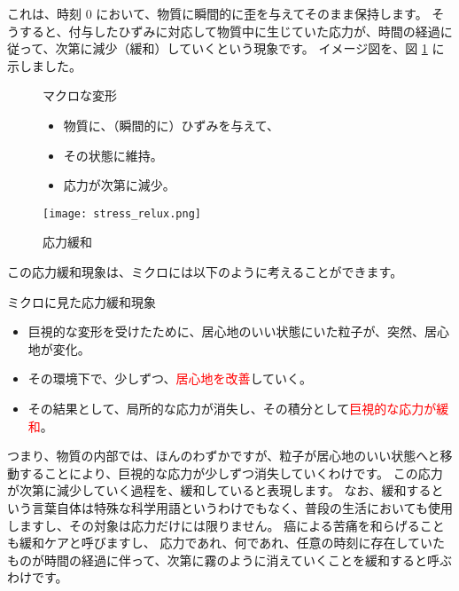 \documentclass[uplatex,dvipdfmx,a4paper,11pt]{jsarticle}
\begin{document}
これは、時刻 0 において、物質に瞬間的に歪を与えてそのまま保持します。
そうすると、付与したひずみに対応して物質中に生じていた応力が、時間の経過に従って、次第に減少（緩和）していくという現象です。
イメージ図を、図 \ref{fig:stress_relux} に示しました。
\begin{figure}[htb]
	\begin{center}
		\begin{minipage}{0.45\textwidth}
			\begin{itembox}[l]{マクロな変形}
				\begin{itemize}
					\item 物質に、（瞬間的に）ひずみを与えて、
					\item その状態に維持。
					\item 応力が次第に減少。
				\end{itemize}
			\end{itembox}
		\end{minipage}
		\begin{minipage}{0.45\textwidth}
			\begin{center}
			\texttt{[image: stress\_relux.png]}
			\end{center}
		\end{minipage}
		\caption{応力緩和}
		\label{fig:stress_relux}
	\end{center}
\end{figure}

この応力緩和現象は、ミクロには以下のように考えることができます。
\begin{center}
	\begin{minipage}{0.9\textwidth}
		\begin{itembox}[l]{ミクロに見た応力緩和現象}
			\begin{itemize}
				\item 巨視的な変形を受けたために、居心地のいい状態にいた粒子が、突然、居心地が変化。
				\item その環境下で、少しずつ、\textcolor{red}{居心地を改善}していく。
				\item その結果として、局所的な応力が消失し、その積分として\textcolor{red}{巨視的な応力が緩和}。
			\end{itemize}
		\end{itembox}
	\end{minipage}
\end{center}
つまり、物質の内部では、ほんのわずかですが、粒子が居心地のいい状態へと移動することにより、巨視的な応力が少しずつ消失していくわけです。
この応力が次第に減少していく過程を、緩和していると表現します。
なお、緩和するという言葉自体は特殊な科学用語というわけでもなく、普段の生活においても使用しますし、その対象は応力だけには限りません。
癌による苦痛を和らげることも緩和ケアと呼びますし、
応力であれ、何であれ、任意の時刻に存在していたものが時間の経過に伴って、次第に霧のように消えていくことを緩和すると呼ぶわけです。
\end{document}
